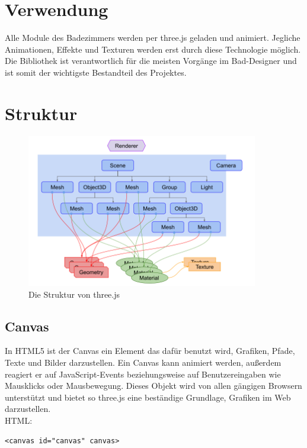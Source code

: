 \section*{Verwendung}
Alle Module des Badezimmers werden per three.js geladen und animiert. Jegliche Animationen, Effekte und Texturen werden erst durch diese Technologie möglich. Die Bibliothek ist verantwortlich für die meisten Vorgänge im Bad-Designer und ist somit der wichtigste Bestandteil des Projektes.

\newpage
\clearpage

\section*{Struktur}
\cite{Fundamentals_English}
\cite{Fundamentals_German}
\begin{figure}[h]
    \centering
    \includegraphics[width=0.9\textwidth]{images/threejs-structure.png}
    \caption{Die Struktur von three.js \cite{threejs_structure}}
    \label{fig:my_label}
\end{figure}

\subsection{Canvas}
In HTML5 ist der Canvas ein Element das dafür benutzt wird, Grafiken, Pfade, Texte und Bilder darzustellen. Ein Canvas kann animiert werden, außerdem reagiert er auf JavaScript-Events beziehungsweise auf Benutzereingaben wie Mausklicks oder Mausbewegung. Dieses Objekt wird von allen gängigen Browsern unterstützt und bietet so three.js eine beständige Grundlage, Grafiken im Web darzustellen. \cite{w3canvas}
\\
HTML:
\begin{lstlisting}
<canvas id="canvas" canvas>
\end{lstlisting}
\newpage
